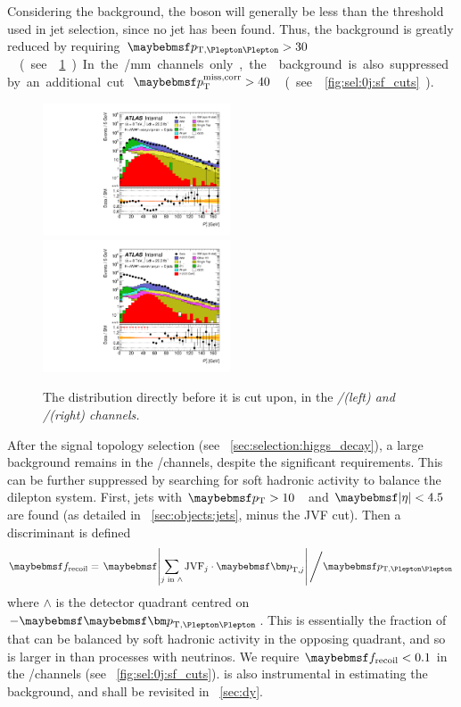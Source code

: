 Considering the \DYll background, the boson \pt will generally be less than the \pt 
threshold used in jet selection, since no jet has been found. Thus, the \DY background is 
greatly reduced by requiring \unit{$\ptll > 30$}{\GeV} (see 
\Figure~\ref{fig:sel:0j:ptll}). In the \ee/\mm channels only, the \DYll background is 
also suppressed by an additional cut \unit{$\corrtrackmet > 40$}{\GeV} (see 
\Figure~\ref{fig:sel:0j:sf_cuts}).

\begin{figure}
	\includegraphics[width=0.495\textwidth]{tex/selection/emme_CutDPhillMET_0jet_Ptll_mh125_log}
	\hfill
	\includegraphics[width=0.495\textwidth]{tex/selection/eemm_CutDPhillMET_0jet_Ptll_mh125_log}
	\caption{The \ptll distribution directly before it is cut upon, in the \em/\me (left) 
	and \ee/\mm (right) channels.}
	\label{fig:sel:0j:ptll}
\end{figure}

After the signal topology selection (see \Section~\ref{sec:selection:higgs_decay}), a 
large \DYll background remains in the \ee/\mm channels, despite the significant \met 
requirements. This can be further suppressed by searching for soft hadronic activity to balance the dilepton system. First, jets with \unit{$\pt > 10$}{\GeV} and $\mods{\eta} < 
4.5$ are found (as detailed in \Section~\ref{sec:objects:jets}, minus the JVF cut). 
Then a discriminant is defined
\begin{equation}
	\frecoil = \left. \mods{\sum\limits_{j\text{ in }\wedge} \text{JVF}_{j} \cdot \bvec{p}_{\text{T,}j}} \, \middle/ \ptll \right.
	\label{eq:frecoil}
\end{equation}
where $\wedge$ is the detector quadrant centred on $-\ptllvec$. This is essentially the 
fraction of \ptll that can be balanced by soft hadronic activity in the opposing quadrant,
and so is larger in \DYll than processes with neutrinos. We require $\frecoil < 0.1$ in 
the \ee/\mm channels (see \Figure~\ref{fig:sel:0j:sf_cuts}). \frecoil is also 
instrumental in estimating the \DYll background, and shall be revisited in 
\Section~\ref{sec:dy}.

